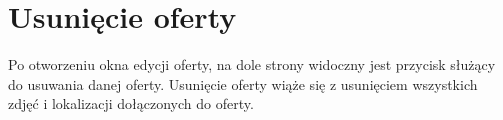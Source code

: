\section{Usunięcie oferty}
Po otworzeniu okna edycji oferty, na dole strony widoczny jest przycisk służący do usuwania danej oferty. Usunięcie oferty wiąże się z usunięciem wszystkich zdjęć i lokalizacji dołączonych do oferty.\\
\\
\begin{minipage}{\linewidth}
\label{delete-offer}
\end{minipage}\\ 

